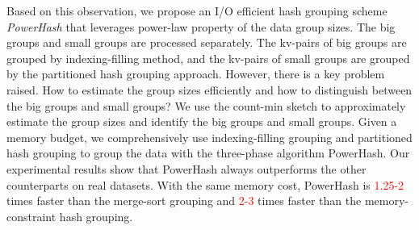 Based on this observation, we propose an I/O efficient hash grouping scheme \emph{PowerHash} that leverages power-law property of the data group sizes. The big groups and small groups are processed separately. The kv-pairs of big groups are grouped by indexing-filling method, and the kv-pairs of small groups are grouped by the partitioned hash grouping approach. However, there is a key problem raised. How to estimate the group sizes efficiently and how to distinguish between the big groups and small groups? We use the count-min sketch \cite{Cormode2009Count} to approximately estimate the group sizes and identify the big groups and small groups. Given a memory budget, we comprehensively use indexing-filling grouping and partitioned hash grouping to group the data with the three-phase algorithm PowerHash. Our experimental results show that PowerHash always outperforms the other counterparts on real datasets. With the same memory cost, PowerHash is \textcolor{red}{1.25-2} times faster than the merge-sort grouping and \textcolor{red}{2-3} times faster than the memory-constraint hash grouping.

